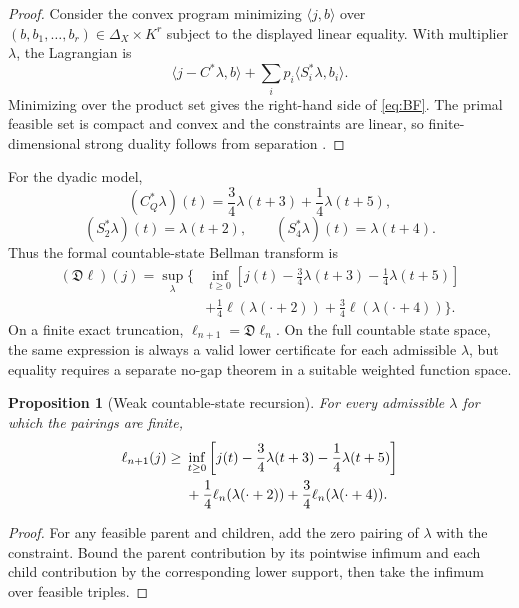 \documentclass[11pt,a4paper]{article}
\newtheorem{proposition}[theorem]{Proposition}
\theoremstyle{definition}
\theoremstyle{remark}
\newcommand{\cD}{\mathfrak D}
\begin{document}
\begin{proof}
Consider the convex program minimizing \(\langle j,b\rangle\) over
\((b,b_1,\ldots,b_r)\in\Delta_X\times K^r\) subject to the displayed linear
equality.  With multiplier \(\lambda\), the Lagrangian is
\[
 \langle j-C^*\lambda,b\rangle
 +\sum_i p_i\langle S_i^*\lambda,b_i\rangle.
\]
Minimizing over the product set gives the right-hand side of \eqref{eq:BF}.
The primal feasible set is compact and convex and the constraints are linear,
so finite-dimensional strong duality follows from separation
\cite{Rockafellar1970}.
\end{proof}

For the dyadic model,
\[
 (C_Q^*\lambda)(t)=\frac34\lambda(t+3)+\frac14\lambda(t+5),
\]
\[
 (S_2^*\lambda)(t)=\lambda(t+2),
 \qquad
 (S_4^*\lambda)(t)=\lambda(t+4).
\]
Thus the formal countable-state Bellman transform is
\begin{equation}
\boxed{
\begin{aligned}
(\cD\ell)(j)=\sup_{\lambda}\Bigg\{&
\inf_{t\ge0}\left[j(t)-\frac34\lambda(t+3)-\frac14\lambda(t+5)\right]\\
&+\frac14\ell(\lambda(\cdot+2))
+\frac34\ell(\lambda(\cdot+4))
\Bigg\}.
\end{aligned}}
\label{eq:Ddyadic}
\end{equation}
On a finite exact truncation, \(\ell_{n+1}=\cD\ell_n\).  On the full
countable state space, the same expression is always a valid lower certificate
for each admissible \(\lambda\), but equality requires a separate no-gap
theorem in a suitable weighted function space.

\begin{proposition}[Weak countable-state recursion]
For every admissible \(\lambda\) for which the pairings are finite,
\begin{align}
\ell_{n+1}(j)\ge{}&
\inf_{t\ge0}\left[j(t)-\frac34\lambda(t+3)-\frac14\lambda(t+5)\right]
\notag\\
&+\frac14\ell_n(\lambda(\cdot+2))
+\frac34\ell_n(\lambda(\cdot+4)).
\label{eq:weakD}
\end{align}
\end{proposition}

\begin{proof}
For any feasible parent and children, add the zero pairing of \(\lambda\) with
the constraint.  Bound the parent contribution by its pointwise infimum and
each child contribution by the corresponding lower support, then take the
infimum over feasible triples.
\end{proof}
\end{document}

